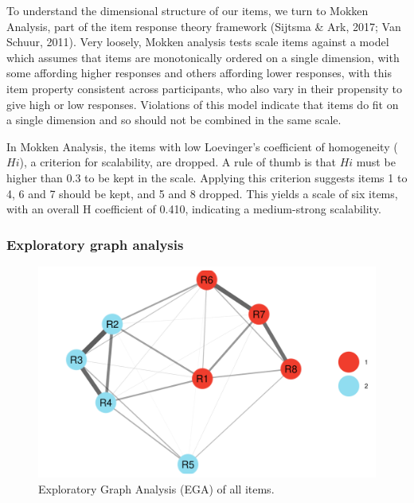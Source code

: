 \documentclass[
  ,jou,floatsintext]{apa6}
\begin{document}
To understand the dimensional structure of our items, we turn to Mokken Analysis, part of the item response theory framework (Sijtsma \& Ark, 2017; Van Schuur, 2011). Very loosely, Mokken analysis tests scale items against a model which assumes that items are monotonically ordered on a single dimension, with some affording higher responses and others affording lower responses, with this item property consistent across participants, who also vary in their propensity to give high or low responses. Violations of this model indicate that items do fit on a single dimension and so should not be combined in the same scale.

In Mokken Analysis, the items with low Loevinger's coefficient of homogeneity (\(H i\)), a criterion for scalability, are dropped. A rule of thumb is that \(H i\) must be higher than 0.3 to be kept in the scale. Applying this criterion suggests items 1 to 4, 6 and 7 should be kept, and 5 and 8 dropped. This yields a scale of six items, with an overall H coefficient of 0.410, indicating a medium-strong scalability.

\hypertarget{exploratory-graph-analysis}{%
\subsubsection{Exploratory graph analysis}\label{exploratory-graph-analysis}}

\begin{figure}

{\centering \includegraphics[width=1\linewidth]{plots/reason_ega} 

}

\caption{Exploratory Graph Analysis (EGA) of all items.}\label{fig:egafull}
\end{figure}
\end{document}
